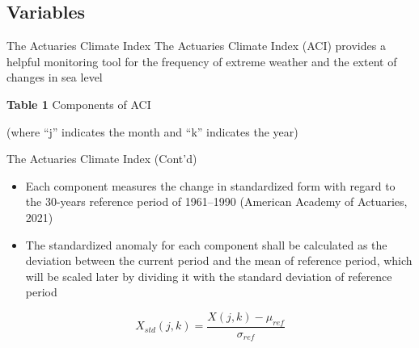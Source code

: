 \documentclass[aspectratio=169]{beamer}
\begin{document}
\subsection{Variables}
\begin{frame}{The Actuaries Climate Index}
    The Actuaries Climate Index (ACI) provides a helpful monitoring tool for the frequency of extreme weather and the extent of changes in sea level
    
    \vspace{5 pt}
    \begin{center}
    \scriptsize{\textbf{Table 1} Components of ACI}\\
    \end{center}
    
    \vspace{10pt}
    
    \tiny{(where “j” indicates the month and “k” indicates the year)}
\end{frame}

\begin{frame}{The Actuaries Climate Index (Cont'd)}
    \begin{itemize}
        \item Each component measures the change in standardized form with regard to the 30-years reference period of 1961–1990 (American Academy of Actuaries, 2021)
        \item The standardized anomaly for each component shall be calculated as the deviation between the current period and the mean of reference period, which will be scaled later by dividing it with the standard deviation of reference period
    \end{itemize}    
    \begin{equation}
        X_{std}(j,k) = \frac{X(j,k)-\mu_{ref}}{\sigma_{ref}}
    \end{equation}
\end{frame}
\end{document}
